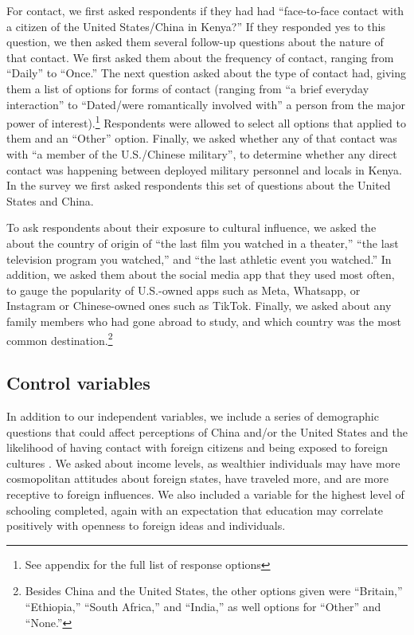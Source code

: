 For contact, we first asked respondents if they had had ``face-to-face contact with a citizen of the United States/China in Kenya?'' If they responded yes to this question, we then asked them several follow-up questions about the nature of that contact. We first asked them about the frequency of contact, ranging from ``Daily'' to ``Once.'' The next question asked about the type of contact had, giving them a list of options for forms of contact (ranging from ``a brief everyday interaction'' to ``Dated/were romantically involved with'' a person from the major power of interest).\footnote{See appendix for the full list of response options} Respondents were allowed to select all options that applied to them and an ``Other'' option. Finally, we asked whether any of that contact was with ``a member of the U.S./Chinese military'', to determine whether any direct contact was happening between deployed military personnel and locals in Kenya. In the survey we first asked respondents this set of questions about the United States and China.

To ask respondents about their exposure to cultural influence, we asked the about the country of origin of ``the last film you watched in a theater,'' ``the last television program you watched,'' and ``the last athletic event you watched.'' In addition, we asked them about the social media app that they used most often, to gauge the popularity of U.S.-owned apps such as Meta, Whatsapp, or Instagram or Chinese-owned ones such as TikTok. Finally, we asked about any family members who had gone abroad to study, and which country was the most common destination.\footnote{Besides China and the United States, the other options given were ``Britain,'' ``Ethiopia,'' ``South Africa,'' and ``India,'' as well options for ``Other'' and ``None.''}

\subsection*{Control variables} 

In addition to our independent variables, we include a series of demographic questions that could affect perceptions of China and/or the United States and the likelihood of having contact with foreign citizens and being exposed to foreign cultures \cite{clarke2005}. We asked about income levels, as wealthier individuals may have more cosmopolitan attitudes about foreign states, have traveled more, and are more receptive to foreign influences. We also included a variable for the highest level of schooling completed, again with an expectation that education may correlate positively with openness to foreign ideas and individuals.

